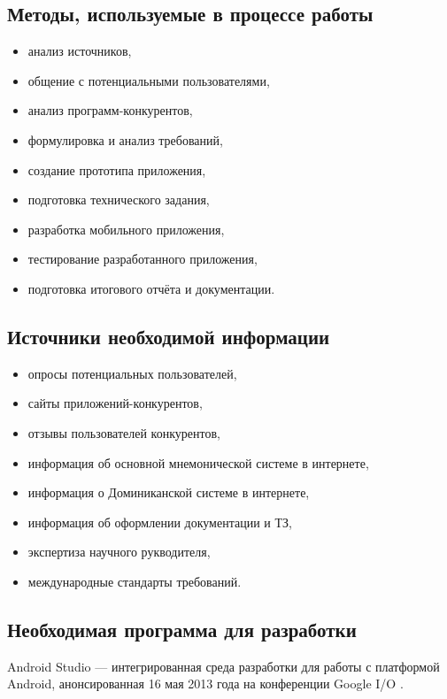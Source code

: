 \documentclass[draft]{article}
\begin{document}
\subsection{Методы, используемые в процессе работы}
\begin{itemize}
\item анализ источников,
\item общение с потенциальными пользователями,
\item анализ программ-конкурентов,
\item формулировка и анализ требований,
\item создание прототипа приложения,
\item подготовка технического задания,
\item разработка мобильного приложения,
\item тестирование разработанного приложения,
\item подготовка итогового отчёта и документации.
\end{itemize}
\subsection{Источники необходимой информации}
\begin{itemize}
\item опросы потенциальных пользователей,
\item сайты приложений-конкурентов,
\item отзывы пользователей конкурентов,
\item информация об основной мнемонической системе в интернете,
\item информация о Доминиканской системе в интернете,
\item информация об оформлении документации и ТЗ,
\item экспертиза научного рукводителя,
\item международные стандарты требований.
\end{itemize}
\subsection{Необходимая программа для разработки}
Android Studio — интегрированная среда разработки для работы с платформой Android, анонсированная 16 мая 2013 года на конференции Google I/O \cite{litlink1}.
\end{document}
